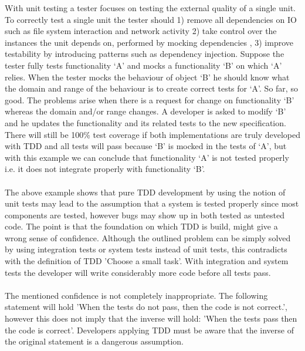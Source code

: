 \begin{itshape}
\begin{addmargin}[1em]{1em}
With unit testing a tester focuses on testing the external quality of a single unit. To correctly test a single unit
the tester should 1) remove all dependencies on IO such as file system interaction and network activity 2) take
control over the instances the unit depends on, performed by mocking dependencies \autocite{XP_EXAMINED}, 3) improve
testability by introducing patterns such as dependency injection. Suppose the
tester fully tests functionality `A' and mocks a functionality `B' on which `A' relies. When the tester
mocks the behaviour of object `B' he should know what the domain and range of the behaviour is to create correct
tests for `A'. So far, so good. The problems arise when there is a request for change on functionality `B'
whereas the domain and/or range changes. A developer is asked to modify `B' and he updates the functionality and its related
tests to the new specification. There will still be 100\% test coverage if both implementations are truly developed
with TDD and all tests will pass because `B' is mocked in the tests of `A', but with this example we can conclude that functionality `A' is not tested
properly i.e. it does not integrate properly with functionality `B'.
\end{addmargin}
\end{itshape}

\paragraph{}
The above example shows that pure TDD development by using the notion of unit tests may lead to the assumption that a
system is tested properly since most components are tested, however bugs may show up in both tested as untested code.
The point is that the foundation on which TDD is build, might give a wrong sense of confidence. Although the outlined
problem can be simply solved by using integration tests or system tests instead of unit tests, this contradicts with the definition of
TDD 'Choose a small task'. With integration and system tests the developer will write considerably more code before all tests pass.

\paragraph{}
The mentioned confidence is not completely inappropriate. The following statement will hold 'When the tests do not
pass, then the code is not correct.', however this does not imply that the inverse will hold: 'When the tests
pass then the code is correct'. Developers applying TDD must be aware that the inverse of the original statement is a
dangerous assumption.

